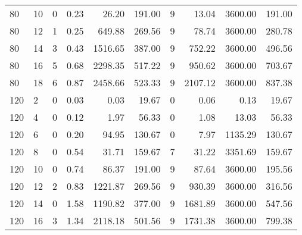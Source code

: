 \begin{appendices}
\begin{table*}[h]
\begin{center}
\begin{tabular} {l l | r r r r | r r r r}
80 & 10                                 &  0           &  0.23        &  26.20       & 191.00          &  9            &  13.04       & 3600.00      & 191.00      \\ 
80 & 12                                 &  1           &  0.25        &  649.88      & 269.56          &  9            &  78.74       & 3600.00      & 280.78      \\ 
80 & 14                                 &  3           &  0.43        &  1516.65     & 387.00          &  9            &  752.22      & 3600.00      & 496.56      \\ 
80 & 16                                 &  5           &  0.68        &  2298.35     & 517.22          &  9            &  950.62      & 3600.00      & 703.67      \\ 
80 & 18                                 &  6           &  0.87        &  2458.66     & 523.33          &  9            &  2107.12     & 3600.00      & 837.38      \\ 
120 & 2                                 &  0           &  0.03        &  0.03        & 19.67           &  0            &  0.06        & 0.13         & 19.67       \\ 
120 & 4                                 &  0           &  0.12        &  1.97        & 56.33           &  0            &  1.08        & 13.03        & 56.33       \\ 
120 & 6                                 &  0           &  0.20        &  94.95       & 130.67          &  0            &  7.97        & 1135.29      & 130.67      \\ 
120 & 8                                 &  0           &  0.54        &  31.71       & 159.67          &  7            &  31.22       & 3351.69      & 159.67      \\ 
120 & 10                                &  0           &  0.74        &  86.37       & 191.00          &  9            &  87.64       & 3600.00      & 195.56      \\ 
120 & 12                                &  2           &  0.83        &  1221.87     & 269.56          &  9            &  930.39      & 3600.00      & 316.56      \\ 
120 & 14                                &  0           &  1.58        &  1190.82     & 377.00          &  9            &  1681.89     & 3600.00      & 547.56      \\ 
120 & 16                                &  3           &  1.34        &  2118.18     & 501.56          &  9            &  1731.38     & 3600.00      & 799.38      \\ 

\end{tabular}
\end{center}
\end{table*}
\end{appendices}
